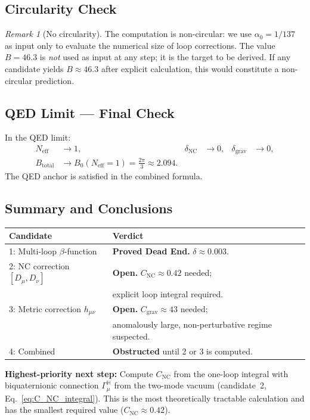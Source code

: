 \documentclass[11pt,a4paper]{article}
\theoremstyle{remark}
\newtheorem{remark}{Remark}
\begin{document}
\subsection{Circularity Check}

\begin{remark}[No circularity]
The computation is non-circular: we use $\alpha_0 = 1/137$ as input only to evaluate the
numerical size of loop corrections. The value $B = 46.3$ is \emph{not} used as input at any
step; it is the target to be derived. If any candidate yields $B \approx 46.3$ after
explicit calculation, this would constitute a non-circular prediction.
\end{remark}

\subsection{QED Limit — Final Check}

In the QED limit:
\begin{align}
  N_{\mathrm{eff}} &\to 1, & \delta_{\mathrm{NC}} &\to 0, & \delta_{\mathrm{grav}} &\to 0, \\
  B_{\mathrm{total}} &\to B_0(N_{\mathrm{eff}} = 1) = \frac{2\pi}{3} \approx 2.094.
\end{align}
The QED anchor is satisfied in the combined formula. \checkmark

\subsection{Summary and Conclusions}

\begin{center}
\begin{tabular}{ll}
  \toprule
  \textbf{Candidate} & \textbf{Verdict} \\
  \midrule
  1: Multi-loop $\beta$-function & \textbf{Proved Dead End.} $\delta \approx 0.003$. \\
  2: NC correction $[D_\mu, D_\nu]$ & \textbf{Open.} $C_{\mathrm{NC}} \approx 0.42$ needed; \\
    & explicit loop integral required. \\
  3: Metric correction $h_{\mu\nu}$ & \textbf{Open.} $C_{\mathrm{grav}} \approx 43$ needed; \\
    & anomalously large, non-perturbative regime suspected. \\
  4: Combined & \textbf{Obstructed} until 2 or 3 is computed. \\
  \bottomrule
\end{tabular}
\end{center}

\bigskip
\textbf{Highest-priority next step:} Compute $C_{\mathrm{NC}}$ from the one-loop integral
with biquaternionic connection $\Gamma_\mu^{\mathbb{H}}$ from the two-mode vacuum
(candidate~2, Eq.~\eqref{eq:C_NC_integral}). This is the most theoretically tractable
calculation and has the smallest required value ($C_{\mathrm{NC}} \approx 0.42$).

\ifdefined\INCLUDEMODE\else
\end{document}
